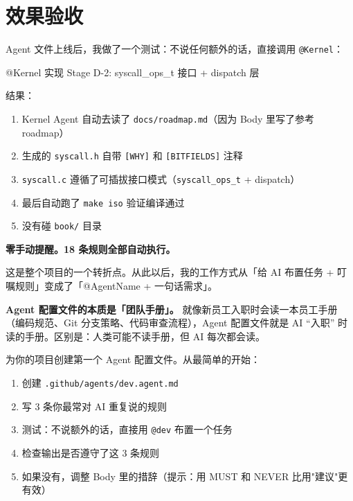 \section{效果验收}

Agent 文件上线后，我做了一个测试：不说任何额外的话，直接调用 \texttt{@Kernel}：

\begin{humanmsg}
@Kernel 实现 Stage D-2: syscall\_ops\_t 接口 + dispatch 层
\end{humanmsg}

结果：

\begin{enumerate}
  \item Kernel Agent 自动去读了 \texttt{docs/roadmap.md}（因为 Body 里写了参考 roadmap）
  \item 生成的 \texttt{syscall.h} 自带 \texttt{[WHY]} 和 \texttt{[BITFIELDS]} 注释
  \item \texttt{syscall.c} 遵循了可插拔接口模式（\texttt{syscall\_ops\_t} + dispatch）
  \item 最后自动跑了 \texttt{make iso} 验证编译通过
  \item 没有碰 \texttt{book/} 目录
\end{enumerate}

\textbf{零手动提醒。18 条规则全部自动执行。}

这是整个项目的一个转折点。从此以后，我的工作方式从「给 AI 布置任务 + 叮嘱规则」变成了「@AgentName + 一句话需求」。

\begin{lessonbox}
\textbf{Agent 配置文件的本质是「团队手册」。} 就像新员工入职时会读一本员工手册（编码规范、Git 分支策略、代码审查流程），Agent 配置文件就是 AI ``入职'' 时读的手册。区别是：人类可能不读手册，但 AI 每次都会读。
\end{lessonbox}

\begin{exercise}
为你的项目创建第一个 Agent 配置文件。从最简单的开始：
\begin{enumerate}
  \item 创建 \texttt{.github/agents/dev.agent.md}
  \item 写 3 条你最常对 AI 重复说的规则
  \item 测试：不说额外的话，直接用 \texttt{@dev} 布置一个任务
  \item 检查输出是否遵守了这 3 条规则
  \item 如果没有，调整 Body 里的措辞（提示：用 MUST 和 NEVER 比用"建议"更有效）
\end{enumerate}
\end{exercise}
